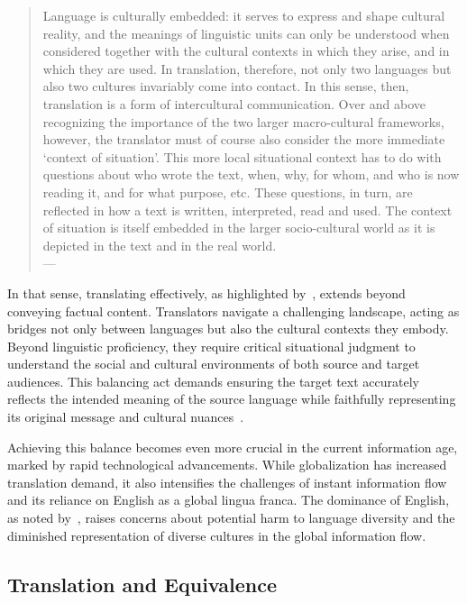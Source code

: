 \begin{quote}
Language is culturally embedded: it serves to express and shape cultural reality, and the meanings of linguistic units can only be understood when considered together with the cultural contexts in which they arise, and in which they are used. In translation, therefore, not only two languages but also two cultures invariably come into contact. In this sense, then, translation is a form of intercultural communication. Over and above recognizing the importance of the two larger macro-cultural frameworks, however, the translator must of course also consider the more immediate ‘context of situation’. This more local situational context has to do with questions about who wrote the text, when, why, for whom, and who is now reading it, and for what purpose, etc. These questions, in turn, are reflected in how a text is written, interpreted, read and used. The context of situation is itself embedded in the larger socio-cultural world as it is depicted in the text and in the real world. \\
\phantom{abc} \hfill --- \textcite[4]{house2014translation}
\end{quote}

In that sense, translating effectively, as highlighted by~\textcite{house2014translation}, extends beyond conveying factual content. Translators navigate a challenging landscape, acting as bridges not only between languages but also the cultural contexts they embody. Beyond linguistic proficiency, they require critical situational judgment to understand the social and cultural environments of both source and target audiences. This balancing act demands ensuring the target text accurately reflects the intended meaning of the source language while faithfully representing its original message and cultural nuances~\parencite{house2018}. 

Achieving this balance becomes even more crucial in the current information age, marked by rapid technological advancements. While globalization has increased translation demand, it also intensifies the challenges of instant information flow and its reliance on English as a global lingua franca. The dominance of English, as noted by~\textcite[4]{house2014translation}, raises concerns about potential harm to language diversity and the diminished representation of diverse cultures in the global information flow.


\subsection{Translation and Equivalence}

